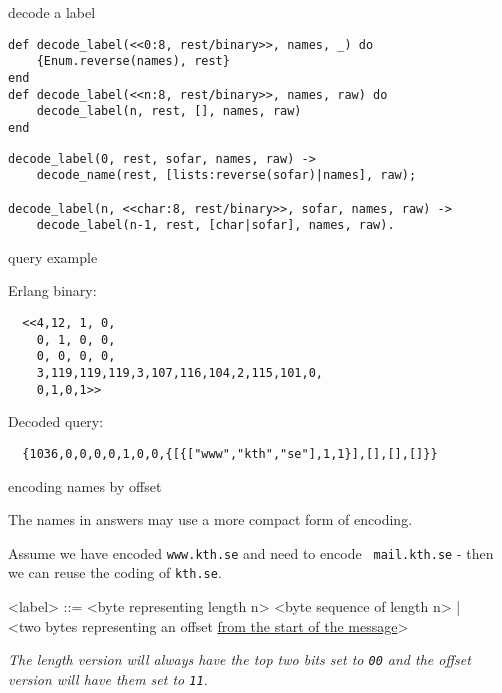 \begin{frame}[fragile]{decode a label}

\begin{verbatim}
def decode_label(<<0:8, rest/binary>>, names, _) do
    {Enum.reverse(names), rest}
end
def decode_label(<<n:8, rest/binary>>, names, raw) do
    decode_label(n, rest, [], names, raw)
end
\end{verbatim}

\vspace{20pt}\pause

\begin{verbatim}
decode_label(0, rest, sofar, names, raw) ->
    decode_name(rest, [lists:reverse(sofar)|names], raw);

decode_label(n, <<char:8, rest/binary>>, sofar, names, raw) ->
    decode_label(n-1, rest, [char|sofar], names, raw).
\end{verbatim}

\end{frame}

\begin{frame}[fragile]{query example}

  Erlang binary:
\begin{verbatim}
  <<4,12, 1, 0,
    0, 1, 0, 0,
    0, 0, 0, 0,
    3,119,119,119,3,107,116,104,2,115,101,0,
    0,1,0,1>>
\end{verbatim}

\vspace{20pt} \pause
  Decoded query:
\begin{verbatim}
  {1036,0,0,0,0,1,0,0,{[{["www","kth","se"],1,1}],[],[],[]}}
\end{verbatim}  

\end{frame}

\begin{frame}{encoding names by offset}

The names in answers may use a more compact form of encoding.  

\vspace{20pt}\pause

Assume we have encoded {\tt www.kth.se} and need to encode {\tt
  mail.kth.se} - then we can reuse the coding of {\tt kth.se}.

\vspace{20pt} \pause

\begin{grammar}
<label> ::=  <byte representing length n> <byte sequence of length n> | \\
             <two bytes representing an offset \underline{ from the start of the message}>
\end{grammar}


\vspace{20pt} \pause


{\em The length version will always have the top two bits set to {\tt 00} and the offset version will have them set to {\tt 11}.}

\end{frame}


